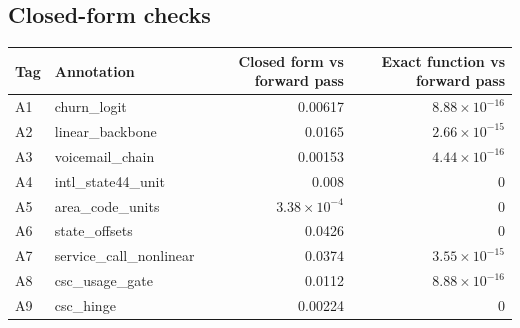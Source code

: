 \begin{drafted}
\subsection{Closed-form checks}\label{app:churn100-s2-c2:closedform}
{\small\noindent\begin{tabularx}{\linewidth}{@{}lXrr@{}}
\toprule Tag & Annotation & Closed form vs forward pass & Exact function vs forward pass \\ \midrule
A1 & churn\_\allowbreak{}logit & 0.00617 & $8.88\times 10^{-16}$ \\
A2 & linear\_\allowbreak{}backbone & 0.0165 & $2.66\times 10^{-15}$ \\
A3 & voicemail\_\allowbreak{}chain & 0.00153 & $4.44\times 10^{-16}$ \\
A4 & intl\_\allowbreak{}state44\_\allowbreak{}unit & 0.008 & 0 \\
A5 & area\_\allowbreak{}code\_\allowbreak{}units & $3.38\times 10^{-4}$ & 0 \\
A6 & state\_\allowbreak{}offsets & 0.0426 & 0 \\
A7 & service\_\allowbreak{}call\_\allowbreak{}nonlinear & 0.0374 & $3.55\times 10^{-15}$ \\
A8 & csc\_\allowbreak{}usage\_\allowbreak{}gate & 0.0112 & $8.88\times 10^{-16}$ \\
A9 & csc\_\allowbreak{}hinge & 0.00224 & 0 \\
\bottomrule
\end{tabularx}\par}

\end{drafted}
